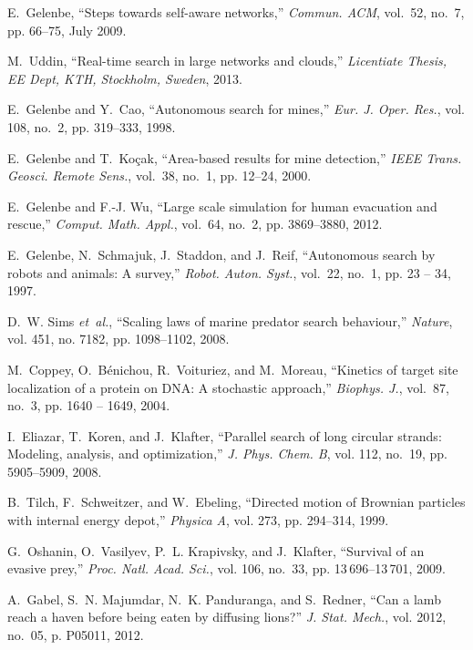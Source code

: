 \documentclass[journal]{IEEEtran}
\begin{document}
\begin{thebibliography}{10}
E.~Gelenbe, ``Steps towards self-aware networks,'' \emph{Commun. ACM}, vol.~52,
  no.~7, pp. 66--75, July 2009.

M.~Uddin, ``Real-time search in large networks and clouds,'' \emph{Licentiate
  Thesis, EE Dept, KTH, Stockholm, Sweden}, 2013.

E.~Gelenbe and Y.~Cao, ``Autonomous search for mines,'' \emph{Eur. J. Oper.
  Res.}, vol. 108, no.~2, pp. 319--333, 1998.

E.~Gelenbe and T.~Ko\c{c}ak, ``Area-based results for mine detection,''
  \emph{IEEE Trans. Geosci. Remote Sens.}, vol.~38, no.~1, pp. 12--24, 2000.

E.~Gelenbe and F.-J. Wu, ``Large scale simulation for human evacuation and
  rescue,'' \emph{Comput. Math. Appl.}, vol.~64, no.~2, pp. 3869--3880, 2012.

E.~Gelenbe, N.~Schmajuk, J.~Staddon, and J.~Reif, ``Autonomous search by robots
  and animals: A survey,'' \emph{Robot. Auton. Syst.}, vol.~22, no.~1, pp. 23
  -- 34, 1997.

D.~W. Sims \emph{et~al.}, ``Scaling laws of marine predator search behaviour,''
  \emph{Nature}, vol. 451, no. 7182, pp. 1098--1102, 2008.

M.~Coppey, O.~B\'enichou, R.~Voituriez, and M.~Moreau, ``Kinetics of target
  site localization of a protein on {DNA}: A stochastic approach,''
  \emph{Biophys. J.}, vol.~87, no.~3, pp. 1640 -- 1649, 2004.

I.~Eliazar, T.~Koren, and J.~Klafter, ``Parallel search of long circular
  strands: Modeling, analysis, and optimization,'' \emph{J. Phys. Chem. B},
  vol. 112, no.~19, pp. 5905--5909, 2008.

B.~Tilch, F.~Schweitzer, and W.~Ebeling, ``Directed motion of {Brownian}
  particles with internal energy depot,'' \emph{Physica A}, vol. 273, pp.
  294--314, 1999.

G.~Oshanin, O.~Vasilyev, P.~L. Krapivsky, and J.~Klafter, ``Survival of an
  evasive prey,'' \emph{Proc. Natl. Acad. Sci.}, vol. 106, no.~33, pp.
  13\,696--13\,701, 2009.

A.~Gabel, S.~N. Majumdar, N.~K. Panduranga, and S.~Redner, ``Can a lamb reach a
  haven before being eaten by diffusing lions?'' \emph{J. Stat. Mech.}, vol.
  2012, no.~05, p. P05011, 2012.


\end{thebibliography}
\end{document}
